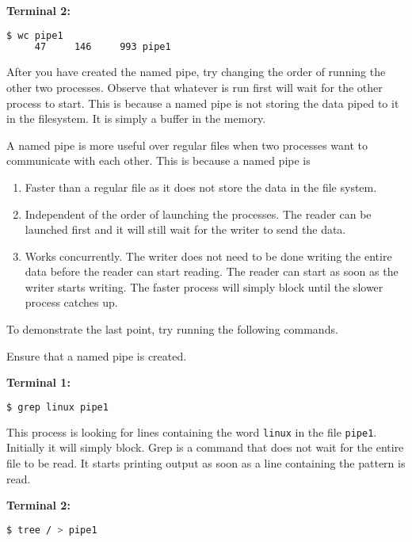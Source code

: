 \textbf{Terminal 2:}
\begin{lstlisting}[language=bash]
$ wc pipe1
     47     146     993 pipe1
\end{lstlisting}

\begin{exercise}
  After you have created the named pipe,
  try changing the order of running the other two processes.
  Observe that whatever is run first will wait for
  the other process to start.
  This is because a named pipe is not storing the data piped to it
  in the filesystem. It is simply a buffer in the memory.
\end{exercise}

A named pipe is more useful over regular files when two processes
want to communicate with each other. This is because a named pipe
is

\begin{enumerate}
  \item Faster than a regular file as it does not store the data in
    the file system.
  \item Independent of the order of launching the processes.
    The reader can be launched first and it will still wait for
    the writer to send the data.
  \item Works concurrently. The writer does not need to be done
    writing the entire data before the reader can start reading.
    The reader can start as soon as the writer starts writing.
    The faster process will simply block until the slower process
    catches up.
\end{enumerate}

To demonstrate the last point, try running the following commands.

Ensure that a named pipe is created.

\textbf{Terminal 1:}

\begin{lstlisting}[language=bash]
$ grep linux pipe1
\end{lstlisting}

This process is looking for lines containing the word \texttt{linux}
in the file \texttt{pipe1}. Initially it will simply block.
Grep is a command that does not wait for the entire file to be read.
It starts printing output as soon as a line containing the pattern
is read.

\textbf{Terminal 2:}
\begin{lstlisting}[language=bash]
$ tree / > pipe1
\end{lstlisting}

